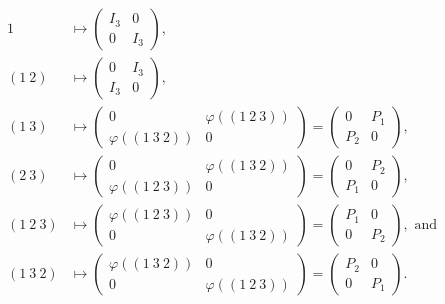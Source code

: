 \documentclass[a4paper, 12pt]{article}
\theoremstyle{Mydefinition}
\theoremstyle{Mytheorem}
\begin{document}
\begin{equation}
    \begin{split}
        1&\mapsto \begin{pmatrix}
            I_3 & 0\\
            0 & I_3
        \end{pmatrix},\\
        (1~2)&\mapsto\begin{pmatrix}
            0 & I_3\\
            I_3 & 0
        \end{pmatrix},\\
        (1~3)&\mapsto\begin{pmatrix}
            0 & \varphi((1~2~3))\\
            \varphi((1~3~2)) & 0
        \end{pmatrix} = \begin{pmatrix}
            0 & P_1\\
            P_2 & 0
        \end{pmatrix},\\
        (2~3)&\mapsto\begin{pmatrix}
            0 & \varphi((1~3~2))\\
            \varphi((1~2~3)) & 0
        \end{pmatrix} = \begin{pmatrix}
            0 & P_2\\
            P_1 & 0
        \end{pmatrix},\\
        (1~2~3)&\mapsto\begin{pmatrix}
            \varphi((1~2~3)) & 0\\
            0 & \varphi((1~3~2))
        \end{pmatrix} = \begin{pmatrix}
            P_1 & 0\\
            0 & P_2
        \end{pmatrix},\textrm{ and}\\
        (1~3~2)&\mapsto\begin{pmatrix}
            \varphi((1~3~2)) & 0\\
            0 & \varphi((1~2~3))
        \end{pmatrix} = \begin{pmatrix}
            P_2 & 0\\
            0 & P_1
        \end{pmatrix}.\\
    \end{split}
\end{equation}
\end{document}
